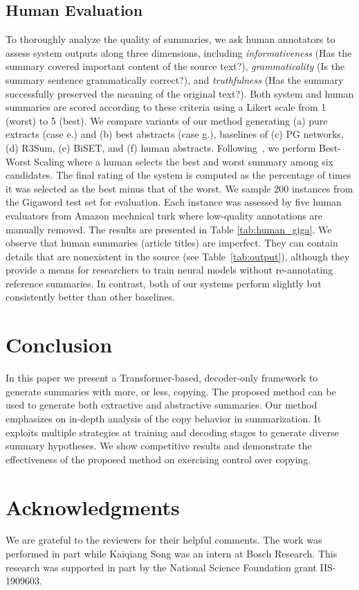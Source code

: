 \documentclass[letterpaper]{article} %
\begin{document}
\subsection{Human Evaluation}
To thoroughly analyze the quality of summaries, we ask human annotators to assess system outputs along three dimensions, including
\emph{informativeness} (Has the summary covered important content of the source text?), 
\emph{grammaticality} (Is the summary sentence grammatically correct?), 
and \emph{truthfulness} (Has the summary successfully preserved the meaning of the original text?).
Both system and human summaries are scored according to these criteria using a Likert scale from 1 (worst) to 5 (best).
We compare variants of our method generating (a) pure extracts (case e.) and (b) best abstracts (case g.), baselines of (c) PG networks, (d) R3Sum, (e) BiSET, and (f) human abstracts.
Following~\cite{liu-lapata-2019-hierarchical}, we perform Best-Worst Scaling
where a human selects the best and worst summary among six candidates.
The final rating of the system is computed as the percentage of times it was selected as the best minus that of the worst.
We sample 200 instances from the Gigaword test set for evaluation.
Each instance was assessed by five human evaluators from Amazon mechnical turk where low-quality annotations are manually removed. 
The results are presented in Table \ref{tab:human_giga}.
We observe that human summaries (article titles) are imperfect.
They can contain details that are nonexistent in the source (see Table~\ref{tab:output}), although they provide a means for researchers to train neural models without re-annotating reference summaries. 
In contrast, both of our systems perform slightly but consistently better than other baselines. 



\section{Conclusion}
\label{sec:conclusion}

In this paper we present a Transformer-based, decoder-only framework to generate summaries with more, or less, copying.
The proposed method can be used to generate both extractive and abstractive summaries.
Our method emphasizes on in-depth analysis of the copy behavior in summarization. 
It exploits multiple strategies at training and decoding stages to generate diverse summary hypotheses. 
We show competitive results and demonstrate the effectiveness of the proposed method on exercising control over copying. 


\section*{Acknowledgments}
We are grateful to the reviewers for their helpful comments. 
The work was performed in part while Kaiqiang Song was an intern at Bosch Research.
This research was supported in part by the National Science Foundation grant IIS-1909603.


\begin{small}


\end{small}
\end{document}
